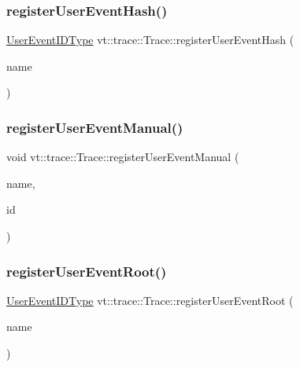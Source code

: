 \subsubsection{\texorpdfstring{register\+User\+Event\+Hash()}{registerUserEventHash()}}
{\footnotesize\ttfamily \hyperlink{namespacevt_1_1trace_a5908920d051c144c89f17c69ed262350}{User\+Event\+I\+D\+Type} vt\+::trace\+::\+Trace\+::register\+User\+Event\+Hash (\begin{DoxyParamCaption}\item[{std\+::string const \&}]{name }\end{DoxyParamCaption})}

\mbox{\label{structvt_1_1trace_1_1_trace_ade8d39718f60924f1aeb178ccda56cbc}} 
\subsubsection{\texorpdfstring{register\+User\+Event\+Manual()}{registerUserEventManual()}}
{\footnotesize\ttfamily void vt\+::trace\+::\+Trace\+::register\+User\+Event\+Manual (\begin{DoxyParamCaption}\item[{std\+::string const \&}]{name,  }\item[{\hyperlink{namespacevt_1_1trace_a70c43e0e1596eea236912d4197d3120a}{User\+Spec\+Event\+I\+D\+Type}}]{id }\end{DoxyParamCaption})}

\mbox{\label{structvt_1_1trace_1_1_trace_a99fcca49a5506c3ee5cda67e541e37cc}} 
\subsubsection{\texorpdfstring{register\+User\+Event\+Root()}{registerUserEventRoot()}}
{\footnotesize\ttfamily \hyperlink{namespacevt_1_1trace_a5908920d051c144c89f17c69ed262350}{User\+Event\+I\+D\+Type} vt\+::trace\+::\+Trace\+::register\+User\+Event\+Root (\begin{DoxyParamCaption}\item[{std\+::string const \&}]{name }\end{DoxyParamCaption})}

